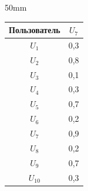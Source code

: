 \begin{floatingfigure}{50mm}
{\begin{center}


    \label{tab:U_7_epsilon_aut}


    \vspace*{2ex}


    


        \tabcolsep=16pt


        \begin{tabular}{|c|c|}


        \hline


          Пользователь   & $U_7$\\


          \hline


          $U_1$& 0,3\\


          $U_2$&0,8\\


          $U_3$&0,1\\


          $U_4$&0,3\\


          $U_5$&0,7\\


          $U_6$&0,2\\


          $U_7$&0,9\\


          $U_8$&0,2\\


          $U_9$&0,7\\


          \hphantom{$_1$}$U_{10}$&0,3\\


        \hline              


              \end{tabular}


    \end{center}}






\vspace*{-24pt}


\end{floatingfigure}











